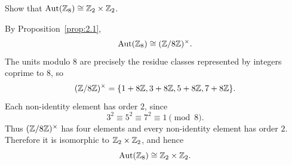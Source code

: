 \documentclass[../Odyssey_Project.tex]{subfiles}
\begin{document}
\begin{exercise}
\label{ex:2.2}
Show that $\operatorname{Aut}(\mathbb{Z}_8) \cong \mathbb{Z}_2 \times \mathbb{Z}_2$.
\end{exercise}
\begin{solution}
    By Proposition~\ref{prop:2.1},
    \[
        \operatorname{Aut}(\mathbb{Z}_8) \cong (\mathbb{Z}/8\mathbb{Z})^{\times}.
    \]
    The units modulo $8$ are precisely the residue classes represented by integers coprime to $8$, so
    \[
        (\mathbb{Z}/8\mathbb{Z})^{\times} = \{1 + 8\mathbb{Z}, 3 + 8\mathbb{Z}, 5 + 8\mathbb{Z}, 7 + 8\mathbb{Z}\}.
    \]
    Each non-identity element has order $2$, since
    \[
        3^2 \equiv 5^2 \equiv 7^2 \equiv 1 \pmod{8}.
    \]
    Thus $(\mathbb{Z}/8\mathbb{Z})^{\times}$ has four elements and every non-identity element has order $2$. Therefore it is isomorphic to $\mathbb{Z}_2 \times \mathbb{Z}_2$, and hence
    \[
        \operatorname{Aut}(\mathbb{Z}_8) \cong \mathbb{Z}_2 \times \mathbb{Z}_2.
    \]
\end{solution}
\end{document}
